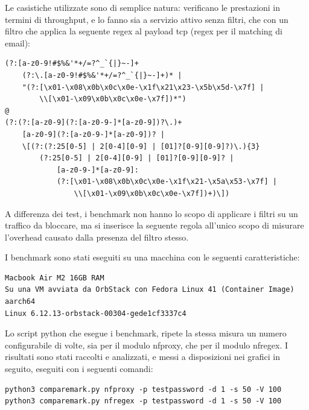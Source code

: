 Le casistiche utilizzate sono di semplice natura: verificano le prestazioni in termini di throughput, e lo fanno sia a servizio attivo senza filtri, che con un filtro che applica la seguente \gls{regex} al payload \gls{tcp} (\gls{regex} per il matching di email):
\begin{verbatim}
(?:[a-z0-9!#$%&'*+/=?^_`{|}~-]+
    (?:\.[a-z0-9!#$%&'*+/=?^_`{|}~-]+)* |
    "(?:[\x01-\x08\x0b\x0c\x0e-\x1f\x21\x23-\x5b\x5d-\x7f] |
        \\[\x01-\x09\x0b\x0c\x0e-\x7f])*")
@
(?:(?:[a-z0-9](?:[a-z0-9-]*[a-z0-9])?\.)+
    [a-z0-9](?:[a-z0-9-]*[a-z0-9])? |
    \[(?:(?:25[0-5] | 2[0-4][0-9] | [01]?[0-9][0-9]?)\.){3}
        (?:25[0-5] | 2[0-4][0-9] | [01]?[0-9][0-9]? |
            [a-z0-9-]*[a-z0-9]:
            (?:[\x01-\x08\x0b\x0c\x0e-\x1f\x21-\x5a\x53-\x7f] |
                \\[\x01-\x09\x0b\x0c\x0e-\x7f])+)\])
\end{verbatim}

A differenza dei test, i benchmark non hanno lo scopo di applicare i filtri su un traffico da bloccare, ma si inserisce la seguente regola all'unico scopo di misurare l'overhead causato dalla presenza del filtro stesso.

I benchmark sono stati eseguiti su una macchina con le seguenti caratteristiche:
\begin{listing}[H]
\begin{verbatim}
Macbook Air M2 16GB RAM
Su una VM avviata da OrbStack con Fedora Linux 41 (Container Image) aarch64
Linux 6.12.13-orbstack-00304-gede1cf3337c4
\end{verbatim}
\vspace{-1em}
\end{listing}

Lo script python che esegue i benchmark, ripete la stessa misura un numero configurabile di volte, sia per il modulo \gls{nfproxy}, che per il modulo \gls{nfregex}.
I risultati sono stati raccolti e analizzati, e messi a disposizioni nei grafici in seguito, eseguiti con i seguenti comandi:
\begin{listing}[H]
\begin{verbatim}
python3 comparemark.py nfproxy -p testpassword -d 1 -s 50 -V 100
python3 comparemark.py nfregex -p testpassword -d 1 -s 50 -V 100
\end{verbatim}
\vspace{-1em}
\end{listing}

